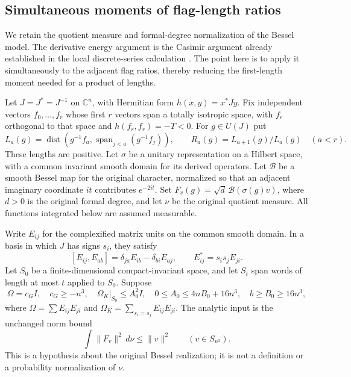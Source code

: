\subsection{Simultaneous moments of flag-length ratios}
\label{mixed-flag-ratio-moments}

We retain the quotient measure and formal-degree normalization of the
Bessel model.  The derivative energy argument is the Casimir argument
already established in the local discrete-series calculation
\cite{mixed-ratio-casimir}.  The point here is to apply it simultaneously
to the adjacent flag ratios, thereby reducing the first-length moment
needed for a product of lengths.

Let $J=J^*=J^{-1}$ on $\mathbb C^n$, with Hermitian form
$h(x,y)=x^*Jy$.  Fix independent vectors $f_0,\ldots,f_r$ whose first
$r$ vectors span a totally isotropic space, with $f_r$ orthogonal to
that space and $h(f_r,f_r)=-T<0$.  For $g\in U(J)$ put
\[
 L_a(g)=\operatorname{dist}\left(g^{-1}f_a,
             \operatorname{span}_{j<a}(g^{-1}f_j)\right),
 \qquad R_a(g)=L_{a+1}(g)/L_a(g)\quad(a<r).
\]
These lengths are positive.  Let $\sigma$ be a unitary representation
on a Hilbert space, with a common invariant smooth domain for its
derived operators.  Let $\mathcal B$ be a smooth Bessel map
for the original character, normalized so that an adjacent imaginary
coordinate $it$ contributes $e^{-2it}$.  Set
$F_v(g)=\sqrt d\,\mathcal B(\sigma(g)v)$, where $d>0$ is the original
formal degree, and let $\nu$ be the original quotient measure.  All
functions integrated below are assumed measurable.

Write $E_{ij}$ for the complexified matrix units on the common smooth
domain.  In a basis in which $J$ has signs $s_i$, they satisfy
\[
 [E_{ij},E_{ab}]=\delta_{ja}E_{ib}-\delta_{bi}E_{aj},\qquad
 E_{ij}^*=s_i s_jE_{ji}.
\]
Let $S_0$ be a finite-dimensional compact-invariant space, and let
$S_t$ span words of length at most $t$ applied to $S_0$.  Suppose
\begin{equation}\label{mixed-ratio-energy-assumptions}
 \Omega=c_G I,\quad c_G\ge-n^3,\quad
 \Omega_K|_{S_0}\le A_0^2I,\quad
 0\le A_0\le4nB_0+16n^3,\quad b\ge B_0\ge16n^3,
\end{equation}
where $\Omega=\sum E_{ij}E_{ji}$ and
$\Omega_K=\sum_{s_i=s_j}E_{ij}E_{ji}$.
The analytic input is the unchanged norm bound
\begin{equation}\label{mixed-ratio-mass-input}
             \int\|F_v\|^2\,d\nu\le\|v\|^2
                      \qquad(v\in S_{n^3}).
\end{equation}
This is a hypothesis about the original Bessel realization; it is not
a definition or a probability normalization of $\nu$.

